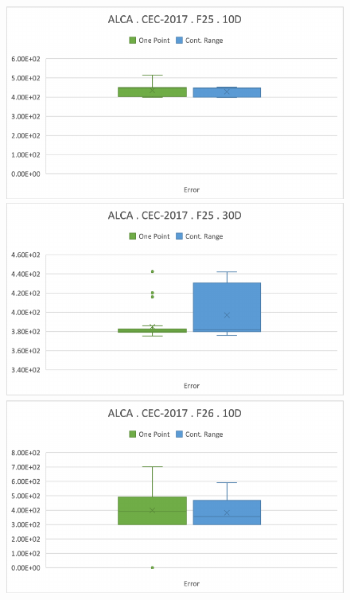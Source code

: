 \documentclass[graybox]{svmult}
\begin{document}
\begin{figure}[!ht]
\begin{minipage}[h]{0.49\linewidth}
        \end{minipage}
        \vfill
        \vspace{0.05 cm}
        \begin{minipage}[h]{0.49\linewidth}
            \includegraphics[width=1\linewidth]{img/fig_experiment_F25x10D.pdf} 
        \end{minipage}
        \hfill
        \begin{minipage}[h]{0.49\linewidth}
            \includegraphics[width=1\linewidth]{img/fig_experiment_F25x30D.pdf} 
        \end{minipage}
        \vfill
        \vspace{0.05 cm}
        \begin{minipage}[h]{0.49\linewidth}
            \includegraphics[width=1\linewidth]{img/fig_experiment_F26x10D.pdf} 

\end{minipage}
\end{figure}
\end{document}
